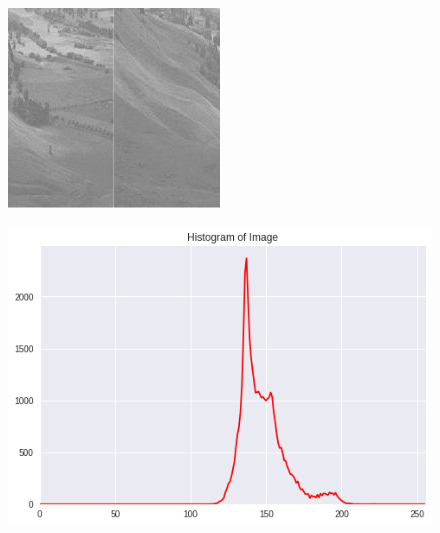 \documentclass{article}
\begin{document}
\begin{enumerate}[label=B\arabic*)]
\begin{enumerate}[label=\arabic*)]
\begin{figure}[h!]
\begin{minipage}{0.32\textwidth}
					\end{minipage}
					\hfill
					\begin{minipage}{0.32\textwidth}
						\centering
						\includegraphics[width=0.9\linewidth]{Hist/Hist2.jpg}
					\end{minipage}
				\end{figure}
				\begin{figure}[h!]
					\centering
					\includegraphics[width=0.6\linewidth]{Hist/Histogram.png}
				\end{figure}
				\begin{figure}[h!]
					\begin{minipage}{0.48\textwidth}
						\centering

\end{minipage}
\end{figure}
\end{enumerate}
\end{enumerate}
\end{document}
